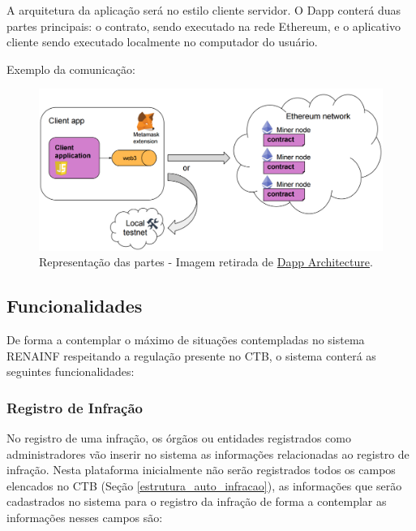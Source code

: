 A arquitetura da aplicação será no estilo cliente servidor. O Dapp conterá duas partes principais: o contrato, sendo executado na rede Ethereum, e o aplicativo cliente sendo executado localmente no computador do usuário.

Exemplo da comunicação:

    \begin{figure}[H]
         \centering
         \includegraphics[scale=0.25]{figuras/capitulo_3/dapp_representacao_comunicacao.png}
         \caption{Representação das partes - Imagem retirada de \href{https://sites.google.com/site/blockchaintutorial/dapp-architecture}{Dapp Architecture}.}
         \label{fig:dapp_representacao}
    \end{figure}



\subsection{Funcionalidades}

De forma a contemplar o máximo de situações contempladas no sistema RENAINF respeitando a regulação presente no CTB, o sistema conterá as seguintes funcionalidades:


    \subsubsection{Registro de Infração}
    
        No registro de uma infração, os órgãos ou entidades registrados como administradores vão inserir no sistema as informações relacionadas ao registro de infração. Nesta plataforma inicialmente não serão registrados todos os campos elencados no CTB (Seção \ref{estrutura_auto_infracao}), as informações que serão cadastrados no sistema para o registro da infração de forma a contemplar as informações nesses campos são:
        

